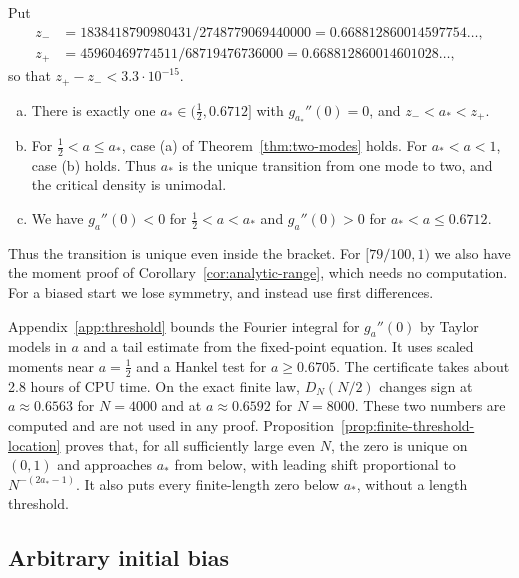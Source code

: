 \begin{theorem}\label{thm:threshold}
Put
\[
 \begin{aligned}
 z_-&=1838418790980431/2748779069440000=0.668812860014597754\ldots,\\
 z_+&=45960469774511/68719476736000=0.668812860014601028\ldots,
 \end{aligned}
\]
so that $z_+-z_-<3.3\cdot10^{-15}$.
\begin{enumerate}[(a)]
\item There is exactly one $a_*\in(\frac12,0.6712]$ with $g_{a_*}''(0)=0$,
and $z_-<a_*<z_+$.
\item For $\frac12<a\le a_*$, case (a) of Theorem~\ref{thm:two-modes}
holds. For $a_*<a<1$, case (b) holds. Thus $a_*$ is the unique transition
from one mode to two, and the critical density is unimodal.
\item We have $g_a''(0)<0$ for $\frac12<a<a_*$ and $g_a''(0)>0$ for
$a_*<a\le0.6712$.
\end{enumerate}
\end{theorem}

Thus the transition is unique even inside the bracket. For
$[79/100,1)$ we also have the moment proof of
Corollary~\ref{cor:analytic-range}, which needs no computation.
For a biased start we lose symmetry, and instead use first differences.

\begin{remark}\label{rem:modes-threshold}
Appendix~\ref{app:threshold} bounds the Fourier integral for $g_a''(0)$
by Taylor models in $a$ and a tail estimate from the fixed-point equation.
It uses scaled moments near $a=\frac12$ and a Hankel test for
$a\ge0.6705$. The certificate takes about 2.8 hours of CPU time.
On the exact finite law,
$D_N(N/2)$ changes sign at $a\approx0.6563$ for $N=4000$ and at
$a\approx0.6592$ for $N=8000$. These two numbers are computed and are not
used in any proof. Proposition~\ref{prop:finite-threshold-location}
proves that, for all sufficiently large even $N$, the zero is unique
on $(0,1)$ and approaches $a_*$ from below, with leading shift
proportional to $N^{-(2a_*-1)}$. It also puts every finite-length
zero below $a_*$, without a length threshold.
\end{remark}


\subsection{Arbitrary initial bias}

